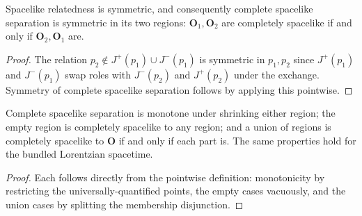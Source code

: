 \begin{lemma}
    \label{lmm:completely-spacelike-symm}
    \leanok
    Spacelike relatedness is symmetric, and consequently complete spacelike separation is symmetric in its two regions: $\mathbf{O}_1, \mathbf{O}_2$ are completely spacelike if and only if $\mathbf{O}_2, \mathbf{O}_1$ are.
\end{lemma}
\begin{proof}
    \leanok
    The relation $p_2 \notin J^+(p_1) \cup J^-(p_1)$ is symmetric in $p_1, p_2$ since $J^+(p_1)$ and $J^-(p_1)$ swap roles with $J^-(p_2)$ and $J^+(p_2)$ under the exchange. Symmetry of complete spacelike separation follows by applying this pointwise.
\end{proof}

\begin{lemma}
    \label{lmm:completely-spacelike-structural}
    \leanok
    Complete spacelike separation is monotone under shrinking either region; the empty region is completely spacelike to any region; and a union of regions is completely spacelike to $\mathbf{O}$ if and only if each part is. The same properties hold for the bundled Lorentzian spacetime.
\end{lemma}
\begin{proof}
    \leanok
    Each follows directly from the pointwise definition: monotonicity by restricting the universally-quantified points, the empty cases vacuously, and the union cases by splitting the membership disjunction.
\end{proof}

